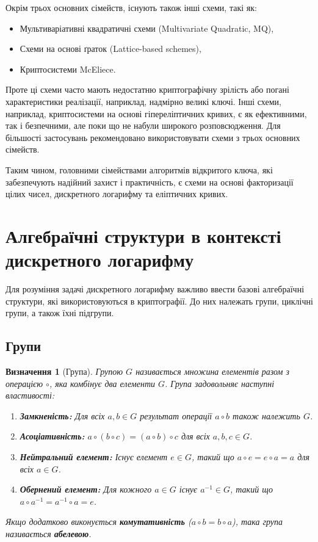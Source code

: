 \documentclass[12pt]{report}
\newtheorem{definition}{Визначення}[chapter]
\begin{document}
Окрім трьох основних сімейств, існують також інші схеми, такі як:
\begin{itemize}
    \item Мультиваріативні квадратичні схеми (Multivariate Quadratic, MQ),
    \item Схеми на основі ґраток (Lattice-based schemes),
    \item Криптосистеми McEliece.
\end{itemize}

Проте ці схеми часто мають недостатню криптографічну зрілість або погані характеристики реалізації, наприклад, надмірно великі ключі. Інші схеми, наприклад, криптосистеми на основі гіпереліптичних кривих, є як ефективними, так і безпечними, але поки що не набули широкого розповсюдження. Для більшості застосувань рекомендовано використовувати схеми з трьох основних сімейств.

Таким чином, головними сімействами алгоритмів відкритого ключа, які забезпечують надійний захист і практичність, є схеми на основі факторизації цілих чисел, дискретного логарифму та еліптичних кривих.

\section{Алгебраїчні структури в контексті дискретного логарифму}

Для розуміння задачі дискретного логарифму важливо ввести базові алгебраїчні структури, які використовуються в криптографії. До них належать групи, циклічні групи, а також їхні підгрупи.

\subsection{Групи}

\begin{definition}[Група]
Групою \( G \) називається множина елементів разом з операцією \( \circ \), яка комбінує два елементи \( G \). Група задовольняє наступні властивості:
\begin{enumerate}
    \item \textbf{Замкненість:} Для всіх \( a, b \in G \) результат операції \( a \circ b \) також належить \( G \).
    \item \textbf{Асоціативність:} \( a \circ (b \circ c) = (a \circ b) \circ c \) для всіх \( a, b, c \in G \).
    \item \textbf{Нейтральний елемент:} Існує елемент \( e \in G \), такий що \( a \circ e = e \circ a = a \) для всіх \( a \in G \).
    \item \textbf{Обернений елемент:} Для кожного \( a \in G \) існує \( a^{-1} \in G \), такий що \( a \circ a^{-1} = a^{-1} \circ a = e \).
\end{enumerate}
Якщо додатково виконується \textbf{комутативність} (\( a \circ b = b \circ a \)), така група називається \textbf{абелевою}.
\end{definition}
\end{document}
